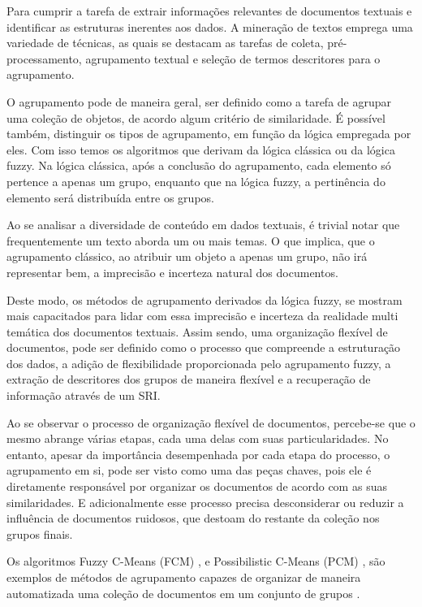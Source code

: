 Para cumprir a tarefa de extrair informações relevantes de documentos textuais e identificar as
estruturas inerentes aos dados. A mineração de textos emprega uma variedade de técnicas, as quais se
destacam as tarefas de coleta, pré-processamento, agrupamento textual e seleção de termos
descritores para o agrupamento. 

O agrupamento pode de maneira geral, ser definido como a tarefa de agrupar uma coleção de objetos,
de acordo algum critério de similaridade. É possível também, distinguir os tipos de agrupamento, em
função da lógica empregada por eles. Com isso temos os algoritmos que derivam da lógica clássica ou
da lógica fuzzy. Na lógica clássica, após a conclusão do agrupamento, cada elemento só pertence a
apenas um grupo, enquanto que na lógica fuzzy, a pertinência do elemento será distribuída entre os
grupos. 

Ao se analisar a diversidade de conteúdo em dados textuais, é trivial notar que frequentemente
um texto aborda um ou mais temas. O que implica, que o agrupamento clássico, ao atribuir um objeto a
apenas um grupo, não irá representar bem, a imprecisão e incerteza natural dos documentos. 

Deste modo, os métodos de agrupamento derivados da lógica fuzzy, se mostram mais capacitados para
lidar com essa imprecisão e incerteza da realidade multi temática dos documentos textuais. Assim
sendo, uma organização flexível de documentos, pode ser definido como o processo que compreende a
estruturação dos dados, a adição de flexibilidade proporcionada pelo agrupamento fuzzy, a extração
de descritores dos grupos de maneira flexível e a recuperação de informação através de um SRI.

Ao se observar o processo de organização flexível de documentos, percebe-se que o mesmo abrange
várias etapas, cada uma delas com suas particularidades. No entanto, apesar da importância
desempenhada por cada etapa do processo, o agrupamento em si, pode ser visto como uma das peças
chaves, pois ele é diretamente responsável por organizar os documentos de acordo com as suas
similaridades. E adicionalmente esse processo precisa desconsiderar ou reduzir a influência de
documentos ruidosos, que destoam do restante da coleção nos grupos finais.

Os algoritmos Fuzzy C-Means (FCM) \cite{Bezdek1984}, e Possibilistic C-Means (PCM)
\cite{Krishnapuram1993}, são exemplos de métodos de agrupamento capazes de organizar de maneira
automatizada uma coleção de documentos em um conjunto de grupos
\cite{Mei2014,Tjhi2009,Prade2008,Saracoglu2008}. 

